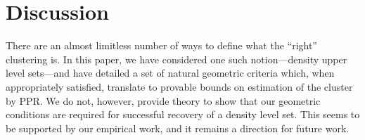 \documentclass{article}
\newcommand{\1}{\mathbf{1}}
\theoremstyle{aldenthm}
\theoremstyle{aldenrmrk}
\begin{document}
\section{Discussion}
\label{sec: discussion}

There are an almost limitless number of ways to define what the ``right''
clustering is. In this paper, we have considered one such notion---density upper
level sets---and have detailed a set of natural geometric criteria which, when 
appropriately satisfied, translate to provable bounds on estimation of the
cluster by PPR. We do not, however, provide theory to show that our geometric
conditions are required for successful recovery of a density level set. This
seems to be supported by our empirical work, and it remains a direction for
future work.  

\clearpage



\end{document}
